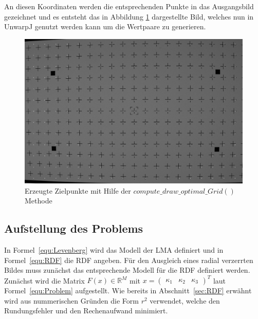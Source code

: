 An diesen Koordinaten werden die entsprechenden Punkte in das Ausgangsbild gezeichnet und es entsteht das in Abbildung \ref{fig:gitter-optimal} dargestellte Bild, welches nun in UnwarpJ genutzt werden kann um die Wertpaare zu generieren.

\begin{figure}[H]
\includegraphics[width=\textwidth]{Images/optimales-gitter.png}
\caption{Erzeugte Zielpunkte mit Hilfe der $compute\_draw\_optimal\_Grid()$ Methode}
\label{fig:gitter-optimal}
\end{figure}

\subsection{Aufstellung des Problems}
\label{sec:Problem}

In Formel~\ref{equ:Levenberg} wird das Modell der LMA definiert und in Formel~\ref{equ:RDF} die RDF angeben. 
Für den Ausgleich eines radial verzerrten Bildes muss zunächst das entsprechende Modell für die RDF definiert werden. Zunächst wird die Matrix $F(x) \in \mathbb{R}^M$ mit $x = \begin{pmatrix}
\kappa_1 & \kappa_2 & \kappa_3\end{pmatrix}^T$ laut Formel~\ref{equ:Problem} aufgestellt. Wie bereits in Abschnitt~\ref{sec:RDF} erwähnt wird aus nummerischen Gründen die Form $r^2$ verwendet, welche den Rundungsfehler und den Rechenaufwand minimiert. 



